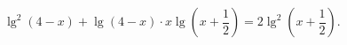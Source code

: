\begin{ex}[type=equation]
	\begin{condition}
		$\lg^2 (4 - x) + \lg (4-x)\cdot x\lg\left(x + \dfrac{1}{2}\right) = 2\lg^2\left(x + \dfrac{1}{2}\right).$
	\end{condition}
\end{ex}